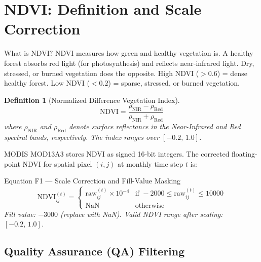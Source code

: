 \documentclass[12pt, a4paper]{article}
\newtheorem{definition}{Definition}[section]
\begin{document}
\section{NDVI: Definition and Scale Correction}
\label{sec:ndvi_def}

\begin{simplebox}{What is NDVI?}
NDVI measures how green and healthy vegetation is.
A healthy forest absorbs red light (for photosynthesis) and reflects
near-infrared light.
Dry, stressed, or burned vegetation does the opposite.
High NDVI ($>0.6$) = dense healthy forest.
Low NDVI ($<0.2$) = sparse, stressed, or burned vegetation.
\end{simplebox}

\begin{definition}[Normalized Difference Vegetation Index]
\label{def:ndvi}
\begin{equation}
  \mathrm{NDVI} =
  \frac{\rho_{\mathrm{NIR}} - \rho_{\mathrm{Red}}}
       {\rho_{\mathrm{NIR}} + \rho_{\mathrm{Red}}}
  \label{eq:ndvi_def}
\end{equation}
where $\rho_{\mathrm{NIR}}$ and $\rho_{\mathrm{Red}}$ denote surface
reflectance in the Near-Infrared and Red spectral bands, respectively.
The index ranges over $[-0.2,\,1.0]$.
\end{definition}

MODIS MOD13A3 stores NDVI as signed 16-bit integers.
The corrected floating-point NDVI for spatial pixel $(i,j)$ at
monthly time step $t$ is:

\begin{mathbox}{Equation F1 — Scale Correction and Fill-Value Masking}
\begin{equation}
  \mathrm{NDVI}_{ij}^{(t)} =
  \begin{cases}
    \mathrm{raw}_{ij}^{(t)} \times 10^{-4} &
      \text{if } -2000 \le \mathrm{raw}_{ij}^{(t)} \le 10000 \\[4pt]
    \mathrm{NaN} & \text{otherwise}
  \end{cases}
  \label{eq:ndvi_scale}
\end{equation}
\textit{Fill value: $-3000$ (replace with NaN). Valid NDVI range after
scaling: $[-0.2,\,1.0]$.}
\end{mathbox}

\subsection*{Quality Assurance (QA) Filtering}
\end{document}
